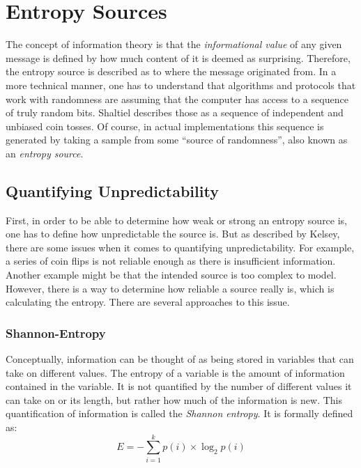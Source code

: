 \section{Entropy Sources}

The concept of information theory is that the \emph{informational value} of any given message is defined by how much content of it is deemed as surprising. Therefore, the entropy source is described as to where the message originated from.
\newline
In a more technical manner, one has to understand that algorithms and protocols that work with randomness are assuming that the computer has access to a sequence of truly random bits.
Shaltiel describes those as a sequence of independent and unbiased coin tosses\cite{randomness:extractor2}.
Of course, in actual implementations this sequence is generated by taking a sample from some “source of randomness”, also known as an \emph{entropy source}.

\subsection{Quantifying Unpredictability}
\label{entropy:quantifying}
First, in order to be able to determine how weak or strong an entropy source is, one has to define how unpredictable the source is.
But as described by Kelsey\cite{entropy1}, there are some issues when it comes to quantifying unpredictability. 
For example, a series of coin flips is not reliable enough as there is insufficient information. Another example might be that the intended source is too complex to model.
\newline
However, there is a way to determine how reliable a source really is, which is calculating the entropy. There are several approaches to this issue.

\subsubsection{Shannon-Entropy}
\label{shannon}
Conceptually, information can be thought of as being stored in variables that can take on different values.
The entropy of a variable is the amount of information contained in the variable.
It is not quantified by the number of different values it can take on or its length, but rather how much of the information is new.
This quantification of information is called the \emph{Shannon entropy}. It is formally defined as:
\begin{equation}
    E = -\sum\limits_{i=1}^k p(i) \times \log_2 p(i)
\end{equation}

